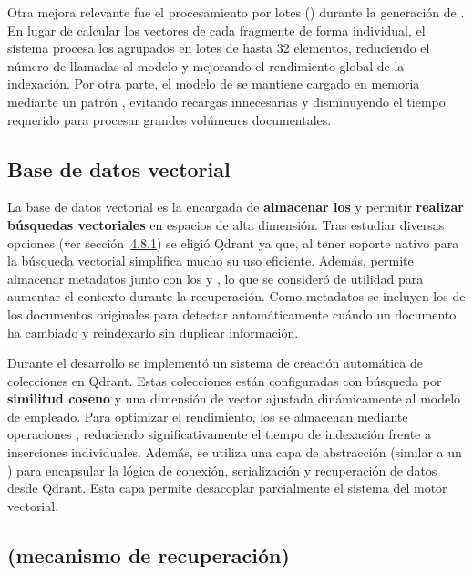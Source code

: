 Otra mejora relevante fue el procesamiento por lotes () durante la generación de . En lugar de calcular los vectores de cada fragmente de forma individual, el sistema procesa los  agrupados en lotes de hasta 32 elementos, reduciendo el número de llamadas al modelo y mejorando el rendimiento global de la indexación. Por otra parte, el modelo de  se mantiene cargado en memoria mediante un patrón , evitando recargas innecesarias y disminuyendo el tiempo requerido para procesar grandes volúmenes documentales.

\subsection{Base de datos vectorial}

La base de datos vectorial es la encargada de \textbf{almacenar los } y permitir \textbf{realizar búsquedas vectoriales} en espacios de alta dimensión. Tras estudiar diversas opciones (ver sección~\hyperref[basedatos_vectorial]{4.8.1}) se eligió Qdrant ya que, al tener soporte nativo para la búsqueda vectorial simplifica mucho su uso eficiente. Además, permite almacenar metadatos junto con los  y , lo que se consideró de utilidad para aumentar el contexto durante la recuperación. Como metadatos se incluyen los  de los documentos originales para detectar automáticamente cuándo un documento ha cambiado y reindexarlo sin duplicar información.

Durante el desarrollo se implementó un sistema de creación automática de colecciones en Qdrant. Estas colecciones están configuradas con búsqueda por \textbf{similitud coseno} y una dimensión de vector ajustada dinámicamente al modelo de  empleado. Para optimizar el rendimiento, los  se almacenan mediante operaciones , reduciendo significativamente el tiempo de indexación frente a inserciones individuales. Además, se utiliza una capa de abstracción (similar a un ) para encapsular la lógica de conexión, serialización y recuperación de datos desde Qdrant. Esta capa permite desacoplar parcialmente el sistema del motor vectorial.

\subsection{ (mecanismo de recuperación)}

